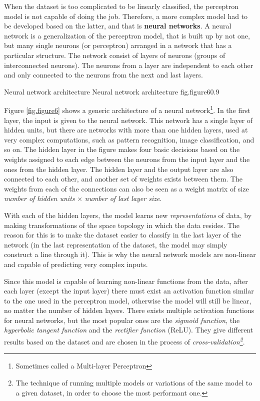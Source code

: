 When the dataset is too complicated to be linearly classified, the perceptron 
model is not capable of doing the job. Therefore, a more complex model had 
to be developed based on the latter, and that is {\bf neural networks}. 
A neural network is a generalization of the perceptron model, that is built up 
by not one, but many single neurons (or perceptron) arranged in a network that 
has a particular structure. The network consist of layers of neurons (groups 
of interconnected neurons). The neurons from a layer are independent to each 
other and only connected to the neurons from the next and last layers. 

%
    {Neural network architecture}%
    {Neural network architecture}%
    {fig.figure6}{0.9}

Figure \ref{fig.figure6} shows a generic architecture of a neural network\footnote
{Sometimes called a Multi-layer Perceptron}. In the first layer, the input is given 
to the neural network. This network has a single layer of hidden units, but 
there are networks with more than one hidden layers, used at very complex 
computations, such as pattern recognition, image classification, and so on. 
The hidden layer in the figure makes four basic decisions based on the weights 
assigned to each edge between the neurons from the input layer and the ones 
from the hidden layer. The hidden layer and the output layer are also connected 
to each other, and another set of weights exists between them. The weights from 
each of the connections can also be seen as a weight matrix of size {\it number 
of hidden units} $\times$ {\it number of last layer size}. 

With each of the hidden layers, the model learns new {\it representations} of 
data, by making transformations of the space topology in which the data resides. 
The reason for this is to make the dataset easier to classify in the last layer 
of the network (in the last representation of the dataset, the model may simply construct 
a line through it). This is why the neural network models are non-linear and 
capable of predicting very complex inputs.

Since this model is capable of learning non-linear functions from the data, 
after each layer (except the input layer) there must exist an activation function 
similar to the one used in the perceptron model, otherwise the model will still 
be linear, no matter the number of hidden layers. There exists multiple activation 
functions for neural networks, but the most popular ones are the {\it sigmoid function}, 
the {\it hyperbolic tangent function} and the {\it rectifier function} (ReLU). They 
give different results based on the dataset and are chosen in the process of 
{\it cross-validation\footnote{The technique of running multiple models or 
variations of the same model to a given dataset, in order to choose the most performant one.}}. 

